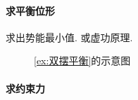 \documentclass{ctexart}
\begin{document}
\paragraph{求平衡位形} %
\label{par:求平衡位形}

求出势能最小值. 或虚功原理.


\begin{figure}[ht]
    \centering
    \caption{\cref{ex:双摆平衡}的示意图}
    \label{fig:双摆平衡的示意图}
\end{figure}

\paragraph{求约束力} %
\label{par:求约束力}
\end{document}
